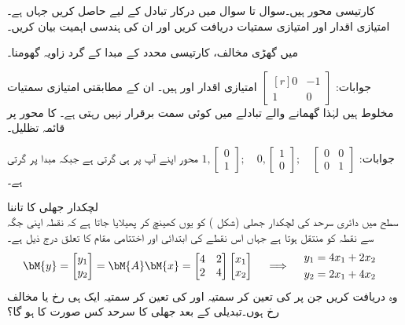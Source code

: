  کارتیسی محور ہیں۔سوال  تا سوال   میں درکار تبادل  کے لیے  حاصل کریں جہاں  ہے۔امتیازی اقدار اور امتیازی سمتیات دریافت کریں اور ان کی ہندسی اہمیت بیان کریں۔


 میں گھڑی مخالف، کارتیسی محدد کے مبدا کے گرد   زاویہ گھومنا۔

جوابات:
$\begin{bmatrix*}[r] 0&-1\\1&0  \end{bmatrix*}$
امتیازی اقدار  اور   ہیں۔ ان کے مطابقتی امتیازی سمتیات مخلوط ہیں لہٰذا گھمانے والے تبادلے میں کوئی سمت برقرار نہیں رہتی ہے۔
 کا  محور پر قائمہ تظلیل۔

جوابات:
$1,\begin{bmatrix} 0\\1 \end{bmatrix}; \quad 0,\begin{bmatrix} 1\\0 \end{bmatrix};\quad \begin{bmatrix}0&0\\0&1  \end{bmatrix}$
محور  اپنے آپ پر ہی گرتی ہے جبکہ  مبدا پر گرتی ہے۔


\quad لچکدار جھلی کا تاننا\\
 سطح میں دائری سرحد  کی لچکدار جھلی (شکل ) کو یوں کھینچ کر پھیلایا جاتا ہے کہ نقطہ  اپنی جگہ سے  نقطہ   کو منتقل ہوتا ہے جہاں اس نقطے کی ابتدائی اور اختتامی  مقام کا تعلق درج ذیل ہے۔
\begin{gather*}
\bM{y}=\begin{bmatrix} y_1\\y_2 \end{bmatrix}=\bM{A}\bM{x}=\begin{bmatrix}4&2\\2&4  \end{bmatrix}\begin{bmatrix} x_1\\x_2 \end{bmatrix}\quad \implies \quad \begin{aligned}y_1&=4x_1+2x_2\\y_2&=2x_1+4x_2&  \end{aligned}
\end{gather*}
وہ  دریافت کریں جن پر  کی تعین کر سمتیہ اور  کی تعین کر سمتیہ ایک ہی رخ یا مخالف رخ ہوں۔تبدیلی کے بعد جھلی کا سرحد کس صورت کا ہو گا؟

